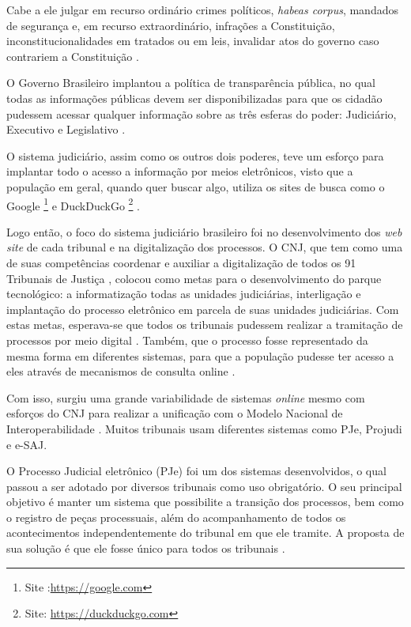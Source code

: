 Cabe a ele julgar em recurso ordinário crimes políticos, \textit{habeas corpus}, mandados de segurança e, em recurso extraordinário, infrações a Constituição, inconstitucionalidades em tratados ou em leis, invalidar atos do governo caso contrariem a Constituição \cite{brasil_constituicao_1988}.

O Governo Brasileiro implantou a política de transparência pública, no qual todas as informações públicas devem ser disponibilizadas para que os cidadão pudessem acessar qualquer informação sobre as três esferas do poder: Judiciário, Executivo e Legislativo \cite{noauthor_lei_2011}.

O sistema judiciário, assim como os outros dois poderes, teve um esforço para implantar todo o acesso a informação por meios eletrônicos, visto que a população em geral, quando quer buscar algo, utiliza os sites de busca como o Google \footnote{Site :\url{https://google.com}} e DuckDuckGo \footnote{Site: \url{https://duckduckgo.com}} \cite{ruschel_governo_2011}.

Logo então, o foco do sistema judiciário brasileiro foi no desenvolvimento dos \textit{web site} de cada tribunal e na digitalização dos processos. O CNJ, que  tem como uma de suas competências coordenar e auxiliar a digitalização de todos os 91 Tribunais de Justiça \cite{ruschel_governo_2011}, colocou como metas para o desenvolvimento do parque tecnológico: a informatização todas as unidades judiciárias, interligação e implantação do processo eletrônico em parcela  de  suas unidades judiciárias. %
Com estas metas, esperava-se que todos os tribunais pudessem realizar a tramitação de processos por meio digital \cite{noauthor_termo_2009}. Também, que o processo fosse representado da mesma forma em diferentes sistemas, para que a população pudesse ter acesso a eles através de mecanismos de consulta online \cite{ruschel_governo_2011}.

Com isso, surgiu uma grande variabilidade de sistemas \textit{online} %
mesmo com esforços do CNJ para realizar a unificação com o Modelo Nacional de Interoperabilidade \cite{noauthor_termo_2009}%
. Muitos tribunais usam diferentes sistemas como PJe, Projudi e e-SAJ.

O Processo Judicial eletrônico (PJe) foi um dos sistemas desenvolvidos, o qual passou a ser adotado por diversos tribunais como uso obrigatório. O seu principal objetivo é manter um sistema que possibilite a transição dos processos, bem como o registro de peças processuais, além do acompanhamento de todos os acontecimentos independentemente do tribunal em que ele tramite. A proposta de sua solução é que ele fosse único para todos os tribunais \cite{noauthor_wiki_2018}.

